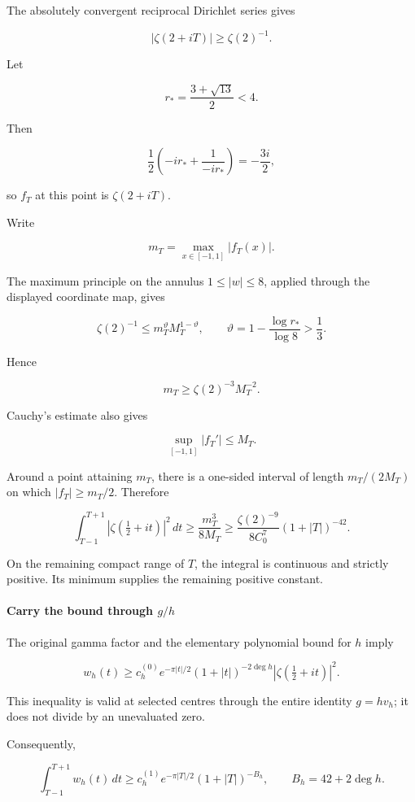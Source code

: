 The absolutely convergent reciprocal Dirichlet series gives

\[
|\zeta(2+iT)|\ge\zeta(2)^{-1}.
\]

Let

\[
r_*=\frac{3+\sqrt{13}}2<4.
\]

Then

\[
\frac12\left(-ir_*+\frac1{-ir_*}\right)=-\frac{3i}{2},
\]

so \(f_T\) at this point is \(\zeta(2+iT)\).

Write

\[
m_T=\max_{x\in[-1,1]}|f_T(x)|.
\]

The maximum principle on the annulus \(1\le|w|\le8\), applied through the displayed coordinate map, gives

\[
\zeta(2)^{-1}
\le
m_T^\vartheta M_T^{1-\vartheta},
\qquad
\vartheta
=
1-\frac{\log r_*}{\log8}
>\frac13.
\]

Hence

\[
m_T\ge\zeta(2)^{-3}M_T^{-2}.
\]

Cauchy's estimate also gives

\[
\sup_{[-1,1]}|f_T'|\le M_T.
\]

Around a point attaining \(m_T\), there is a one-sided interval of length \(m_T/(2M_T)\) on which \(|f_T|\ge m_T/2\). Therefore

\[
\int_{T-1}^{T+1}|\zeta(\tfrac12+it)|^2\,dt
\ge
\frac{m_T^3}{8M_T}
\ge
\frac{\zeta(2)^{-9}}{8C_0^7}(1+|T|)^{-42}.
\]

On the remaining compact range of \(T\), the integral is continuous and strictly positive. Its minimum supplies the remaining positive constant.

\paragraph{\texorpdfstring{Carry the bound through \(g/h\)}{Carry the bound through }}\label{endpoint-user_norm_original--carry-the-bound-through-gh}

The original gamma factor and the elementary polynomial bound for \(h\) imply

\[
w_h(t)
\ge
c_h^{(0)}
e^{-\pi|t|/2}(1+|t|)^{-2\deg h}
|\zeta(\tfrac12+it)|^2.
\]

This inequality is valid at selected centres through the entire identity \(g=hv_h\); it does not divide by an unevaluated zero.

Consequently,

\[
\boxed{
\int_{T-1}^{T+1}w_h(t)\,dt
\ge
c_h^{(1)}
e^{-\pi|T|/2}(1+|T|)^{-B_h},
\qquad
B_h=42+2\deg h.
}
\]

